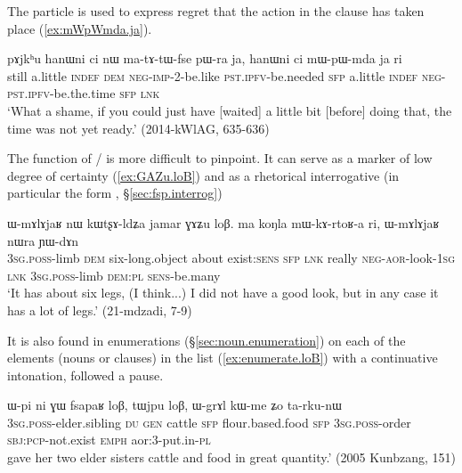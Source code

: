 The particle  is used to express regret that the action in the clause has taken place (\ref{ex:mWpWmda.ja}).

\begin{exe} 
\ex \label{ex:mWpWmda.ja}
\gll   pɤjkʰu hanɯni ci nɯ ma-tɤ-tɯ-fse pɯ-ra ja, hanɯni ci mɯ-pɯ-mda ja ri \\
still a.little \textsc{indef} \textsc{dem} \textsc{neg}-\textsc{imp}-2-be.like \textsc{pst}.\textsc{ipfv}-be.needed \textsc{sfp} 
 a.little \textsc{indef}   \textsc{neg}-\textsc{pst}.\textsc{ipfv}-be.the.time \textsc{sfp}  \textsc{lnk} \\
\glt `What a shame, if you could just have [waited] a little bit [before] doing that, the time was not yet ready.' (2014-kWlAG, 635-636)
\end{exe} 

The function of  /  is more difficult to pinpoint. It can serve as a marker of low degree of certainty (\ref{ex:GAZu.loB}) and as a rhetorical interrogative (in particular the form , §\ref{sec:fsp.interrog})


\begin{exe} 
\ex \label{ex:GAZu.loB}
\gll  ɯ-mɤlɤjaʁ nɯ kɯtʂɤ-ldʑa jamar ɣɤʑu loβ. ma koŋla mɯ-kɤ-rtoʁ-a ri, ɯ-mɤlɤjaʁ nɯra ɲɯ-dɤn \\
 \textsc{3sg}.\textsc{poss}-limb \textsc{dem} six-long.object about exist:\textsc{sens} \textsc{sfp} \textsc{lnk} really \textsc{neg}-\textsc{aor}-look-\textsc{1sg} \textsc{lnk}  \textsc{3sg}.\textsc{poss}-limb \textsc{dem}:\textsc{pl} \textsc{sens}-be.many \\
 \glt `It has about six legs, (I think...) I did not have a good look, but in any case it has a lot of legs.' (21-mdzadi, 7-9)
 \end{exe} 

It is also found in enumerations (§\ref{sec:noun.enumeration}) on each of the elements (nouns or clauses) in the list (\ref{ex:enumerate.loB}) with a continuative intonation, followed a pause.

\begin{exe} 
\ex \label{ex:enumerate.loB}
\gll ɯ-pi ni ɣɯ  fsapaʁ loβ, tɯjpu loβ, ɯ-grɤl kɯ-me ʑo ta-rku-nɯ \\
\textsc{3sg}.\textsc{poss}-elder.sibling \textsc{du} \textsc{gen} cattle \textsc{sfp} flour.based.food  \textsc{sfp} \textsc{3sg}.\textsc{poss}-order \textsc{sbj}:\textsc{pcp}-not.exist \textsc{emph} aor:3\flobv{}-put.in-\textsc{pl} \\
 gave her two elder sisters cattle and food in great quantity.' (2005 Kunbzang, 151)
 \end{exe} 

 